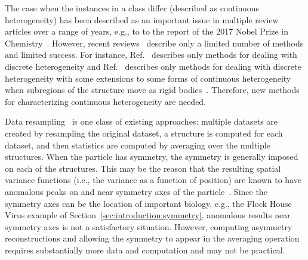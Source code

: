 \par
The case when the instances in a class differ (described as continuous
heterogeneity) has been described as an important issue in
multiple review articles over a range of years, e.g.,
\cite[p.~221]{TaylorGlaeserJSB2008} to
\cite[p.~55]{BaiMcMullanScheres2015} to
the report of the 2017 Nobel Prize in
Chemistry~\cite{nobelprizechemistry2017}.
However, recent reviews~\cite{Ludtke.MethodsEnzymology.2016,Scheres.MethodsEnzymology.2016} describe only a limited number of methods and
limited success.
For instance, Ref.~\cite{Ludtke.MethodsEnzymology.2016} describes only
methods for dealing with discrete heterogeneity and
Ref.~\cite{Scheres.MethodsEnzymology.2016} describes only methods for
dealing with discrete heterogeneity with some extensions to some forms of
continuous heterogeneity when subregions of the structure move as rigid
bodies~\cite[Sections~4.4--4.6]{Scheres.MethodsEnzymology.2016}.
Therefore, new methods for characterizing continuous heterogeneity are needed.
\par
Data resampling~\cite{PenczekKimmelSpahn2011,SpahnPenczek2009,ZhangKimmelSpahnPenczek2008,PenczekYangFrankSpahnBootstrapMethodJSB2006,SimonettiMarziMyasnikovFabbrettiYusupovGualerziKlaholzNature2008} is one class of existing approaches:
multiple datasets are created by resampling the original dataset, a
structure is computed for each dataset, and then statistics are computed by
averaging over the multiple structures.
When the particle has symmetry, the symmetry is generally imposed on each
of the structures.
This may be the reason that the resulting spatial variance functions (i.e.,
the variance as a function of position) are known to have anomalous peaks
on and near symmetry axes of the
particle~\cite[p.~173]{Ludtke.MethodsEnzymology.2016}.
Since the symmetry axes can be the location of important biology, e.g., the
Flock House Virus example of Section~\ref{sec:introduction:symmetry},
anomalous results near symmetry axes is not a satisfactory situation.
However, computing asymmetry reconstructions and allowing the symmetry to
appear in the averaging operation requires substantially more data and
computation and may not be practical.
